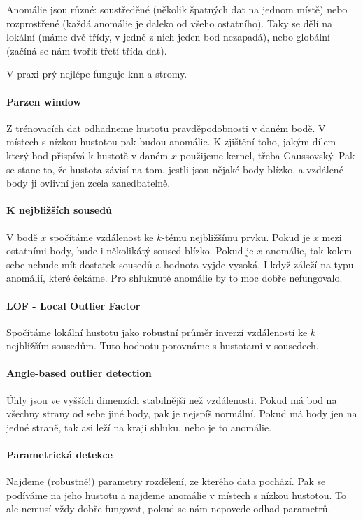 Anomálie jsou různé: soustředěné (několik špatných dat na jednom místě) nebo rozprostřené (každá anomálie je daleko od všeho ostatního). Taky se dělí na lokální (máme dvě třídy, v jedné z nich jeden bod nezapadá), nebo globální (začíná se nám tvořit třetí třída dat).

V praxi prý nejlépe funguje knn a stromy.

\paragraph{Parzen window} Z trénovacích dat odhadneme hustotu pravděpodobnosti v daném bodě. V místech s nízkou hustotou pak budou anomálie. K zjištění toho, jakým dílem který bod přispívá k hustotě v daném $x$ použijeme kernel, třeba Gaussovský. Pak se stane to, že hustota závisí na tom, jestli jsou nějaké body blízko, a vzdálené body ji ovlivní jen zcela zanedbatelně.

\paragraph{K nejbližších sousedů} V bodě $x$ spočítáme vzdálenost ke $k$-tému nejbližšímu prvku. Pokud je $x$ mezi ostatními body, bude i několikátý soused blízko. Pokud je $x$ anomálie, tak kolem sebe nebude mít dostatek sousedů a hodnota vyjde vysoká. I když záleží na typu anomálií, které čekáme. Pro shluknuté anomálie by to moc dobře nefungovalo.

\paragraph{LOF - Local Outlier Factor} Spočítáme lokální hustotu jako robustní průměr inverzí vzdáleností ke $k$ nejbližším sousedům. Tuto hodnotu porovnáme s hustotami v sousedech.

\paragraph{Angle-based outlier detection} Úhly jsou ve vyšších dimenzích stabilnější než vzdálenosti. Pokud má bod na všechny strany od sebe jiné body, pak je nejspíš normální. Pokud má body jen na jedné straně, tak asi leží na kraji shluku, nebo je to anomálie.

\paragraph{Parametrická detekce} Najdeme (robustně!) parametry rozdělení, ze kterého data pochází. Pak se podíváme na jeho hustotu a najdeme anomálie v místech s nízkou hustotou. To ale nemusí vždy dobře fungovat, pokud se nám nepovede odhad parametrů.

